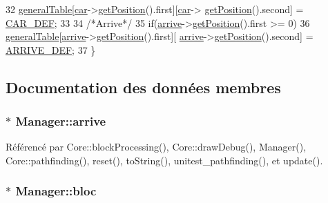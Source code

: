 \begin{DoxyCode}
32         \hyperlink{classManager_ad5d59f4a2b1de265115f4efbbbc60dcd}{generalTable}[\hyperlink{classManager_a2803dff8e8f2912242f4098991d91415}{car}->\hyperlink{classCar_a20dd521474ee36b144bde58e3359eed6}{getPosition}().first][\hyperlink{classManager_a2803dff8e8f2912242f4098991d91415}{car}->
      \hyperlink{classCar_a20dd521474ee36b144bde58e3359eed6}{getPosition}().second] = \hyperlink{definition_8h_a36aebf63f7666a150b14192119d9afa2}{CAR\_DEF};
33 
34     \textcolor{comment}{/*Arrive*/}
35     \textcolor{keywordflow}{if}(\hyperlink{classManager_a6f99d8e25fc61a7fe0fdf160610b31cf}{arrive}->\hyperlink{classArrive_abe91e4a5bcf15ff987ab58c05b6bb537}{getPosition}().first >= 0)
36         \hyperlink{classManager_ad5d59f4a2b1de265115f4efbbbc60dcd}{generalTable}[\hyperlink{classManager_a6f99d8e25fc61a7fe0fdf160610b31cf}{arrive}->\hyperlink{classArrive_abe91e4a5bcf15ff987ab58c05b6bb537}{getPosition}().first][
      \hyperlink{classManager_a6f99d8e25fc61a7fe0fdf160610b31cf}{arrive}->\hyperlink{classArrive_abe91e4a5bcf15ff987ab58c05b6bb537}{getPosition}().second] = \hyperlink{definition_8h_a71cf532814b2e708da69ec435950685d}{ARRIVE\_DEF};
37 \}
\end{DoxyCode}


\subsection{Documentation des données membres}
\hypertarget{classManager_a6f99d8e25fc61a7fe0fdf160610b31cf}{
\subsubsection[{arrive}]{$\ast$ Manager\-::arrive}}\label{classManager_a6f99d8e25fc61a7fe0fdf160610b31cf}


Référencé par Core\-::block\-Processing(), Core\-::draw\-Debug(), Manager(), Core\-::pathfinding(), reset(), to\-String(), unitest\-\_\-pathfinding(), et update().

\hypertarget{classManager_a66599bf2bd10c95b9fb7be9c333e0ff9}{
\subsubsection[{bloc}]{$\ast$ Manager\-::bloc}}\label{classManager_a66599bf2bd10c95b9fb7be9c333e0ff9}


